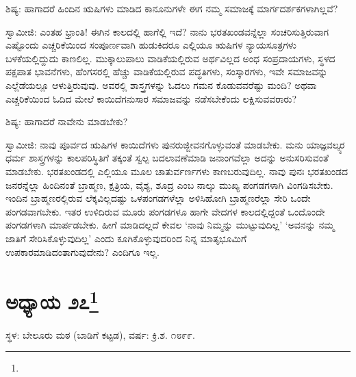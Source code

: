 ಶಿಷ್ಯ: ಹಾಗಾದರೆ ಹಿಂದಿನ ಋಷಿಗಳು ಮಾಡಿದ ಕಾನೂನುಗಳೇ ಈಗ ನಮ್ಮ ಸಮಾಜಕ್ಕೆ ಮಾರ್ಗದರ್ಶಕಗಳಾಗಿಲ್ಲವೆ?

ಸ್ವಾಮೀಜಿ: ಎಂತಹ ಭ್ರಾಂತಿ! ಈಗಿನ ಕಾಲದಲ್ಲಿ ಹಾಗೆಲ್ಲಿ ಇದೆ? ನಾನು ಭರತಖಂಡವನ್ನೆಲ್ಲಾ ಸಂಚರಿಸುತ್ತಿರುವಾಗ ಎಷ್ಟೊಂದು ಎಚ್ಚರಿಕೆಯಿಂದ ಸಂಪೂರ್ಣವಾಗಿ ಹುಡುಕಿದರೂ ಎಲ್ಲಿಯೂ ಋಷಿಗಳ ನ್ಯಾಯಸೂತ್ರಗಳು ಬಳಕೆಯಲ್ಲಿದ್ದುದು ಕಾಣಲಿಲ್ಲ. ಮುಕ್ಕಾಲುಪಾಲು ವಾಡಿಕೆಯಲ್ಲಿರುವ ಅರ್ಥವಿಲ್ಲದ ಅಂಧ ಸಂಪ್ರದಾಯಗಳು, ಸ್ಥಳದ ಪಕ್ಷಪಾತ ಭಾವನೆಗಳು, ಹೆಂಗಸರಲ್ಲಿ ಹೆಚ್ಚು ವಾಡಿಕೆಯಲ್ಲಿರುವ ಪದ್ಧತಿಗಳು, ಸಂಸ್ಕಾರಗಳು, ಇವೇ ಸಮಾಜವನ್ನು ಎಲ್ಲೆಡೆಯಲ್ಲೂ ಆಳುತ್ತಿರುವುವು. ಅವರಲ್ಲಿ ಶಾಸ್ತ್ರಗಳನ್ನು ಓದಲು ಗಮನ ಕೊಡುವವರೆಷ್ಟು ಮಂದಿ? ಅಥವಾ ಎಚ್ಚರಿಕೆಯಿಂದ ಓದಿದ ಮೇಲೆ ಕಾಯಿದೆಗನುಸಾರ ಸಮಾಜವನ್ನು ನಡೆಸಬೇಕೆಂದು ಲಕ್ಷಿಸುವವರಾರು?

ಶಿಷ್ಯ: ಹಾಗಾದರೆ ನಾವೇನು ಮಾಡಬೇಕು?

ಸ್ವಾಮೀಜಿ: ನಾವು ಪೂರ್ವದ ಋಷಿಗಳ ಕಾಯಿದೆಗಳು ಪುನರುಜ್ಜೀವನಗೊಳ್ಳುವಂತೆ ಮಾಡಬೇಕು. ಮನು ಯಾಜ್ಞವಲ್ಕ್ಯರ ಧರ್ಮ ಶಾಸ್ತ್ರಗಳನ್ನು ಕಾಲಪರಿಸ್ಥಿತಿಗೆ ತಕ್ಕಂತೆ ಸ್ವಲ್ಪ ಬದಲಾವಣೆಮಾಡಿ ಜನಾಂಗವೆಲ್ಲಾ ಅದನ್ನು ಅನುಸರಿಸುವಂತೆ ಮಾಡಬೇಕು. ಭರತಖಂಡದಲ್ಲಿ ಎಲ್ಲಿಯೂ ಮೂಲ ಚಾತುರ್ವರ್ಣಗಳು ಕಾಣಬರುವುದಿಲ್ಲ. ನಾವು ಪುನಃ ಭರತಖಂಡದ ಜನರನ್ನೆಲ್ಲಾ ಹಿಂದಿನಂತೆ ಬ್ರಾಹ್ಮಣ, ಕ್ಷತ್ರಿಯ, ವೈಶ್ಯ, ಶೂದ್ರ ಎಂಬ ನಾಲ್ಕು ಮುಖ್ಯ ಪಂಗಡಗಳಾಗಿ ವಿಂಗಡಿಸಬೇಕು. ಇಂದಿನ ಬ್ರಾಹ್ಮಣರಲ್ಲಿರುವ ಲೆಕ್ಕವಿಲ್ಲದಷ್ಟು ಒಳಪಂಗಡಗಳೆಲ್ಲಾ ಅಳಿಸಿಹೋಗಿ ಬ್ರಾಹ್ಮಣರೆಲ್ಲಾ ಸೇರಿ ಒಂದೇ ಪಂಗಡವಾಗಬೇಕು. ಇತರ ಉಳಿದಿರುವ ಮೂರು ಪಂಗಡಗಳೂ ಹಾಗೇ ವೇದಗಳ ಕಾಲದಲ್ಲಿದ್ದಂತೆ ಒಂದೊಂದೇ ಪಂಗಡಗಳಾಗಿ ಮಾರ್ಪಡಬೇಕು. ಹೀಗೆ ಮಾಡಿದಲ್ಲದೆ ಕೇವಲ ‘ನಾವು ನಿಮ್ಮನ್ನು ಮುಟ್ಟುವುದಿಲ್ಲ’ ‘ಅವನನ್ನು ನಮ್ಮ ಜಾತಿಗೆ ಸೇರಿಸಿಕೊಳ್ಳುವುದಿಲ್ಲ’ ಎಂದು ಕೂಗಿಕೊಳ್ಳುವುದರಿಂದ ನಿನ್ನ ಮಾತೃಭೂಮಿಗೆ ಉಪಕಾರಮಾಡಿದಂತಾಗುವುದೇನು? ಎಂದಿಗೂ ಇಲ್ಲ.

\newpage

\chapter[ಅಧ್ಯಾಯ ೨೭]{ಅಧ್ಯಾಯ ೨೭\protect\footnote{}}

\centerline{ಸ್ಥಳ: ಬೇಲೂರು ಮಠ (ಬಾಡಿಗೆ ಕಟ್ಟಡ), ವರ್ಷ: ಕ್ರಿ.ಶ. ೧೮೯೯.}

